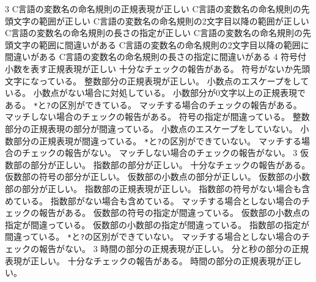 \ProblemNN{


\Newpage


}
{
{}{3}
	{
	{C言語の変数名の命名規則の正規表現が正しい}
	}
	{
	{C言語の変数名の命名規則の先頭文字の範囲が正しい}
	{C言語の変数名の命名規則の2文字目以降の範囲が正しい}
	{C言語の変数名の命名規則の長さの指定が正しい}
	}
	{
	{C言語の変数名の命名規則の先頭文字の範囲に間違いがある}
	{C言語の変数名の命名規則の2文字目以降の範囲に間違いがある}
	{C言語の変数名の命名規則の長さの指定に間違いがある}
	}
	{}{4}
	{
	{符号付小数を表す正規表現が正しい}
	{十分なチェックの報告がある。}
	}
	{
	{符号がないか先頭文字になっている。}
	{整数部分の正規表現が正しい。}
	{小数点のエスケープをしている。}
	{小数点がない場合に対処している。}
	{小数部分が0文字以上の正規表現である。}
	{\texttt{*}と\texttt{?}の区別ができている。}
	{マッチする場合のチェックの報告がある。}
	{マッチしない場合のチェックの報告がある。}
	}
	{
	{符号の指定が間違っている。}
	{整数部分の正規表現の部分が間違っている。}
	{小数点のエスケープをしていない。}
	{小数部分の正規表現が間違っている。}
	{\texttt{*}と\texttt{?}の区別ができていない。}
	{マッチする場合のチェックの報告がない。}
	{マッチしない場合のチェックの報告がない。}
	}
	{}{3}
	{
	{仮数部の部分が正しい。}
	{指数部の部分が正しい。}
	{十分なチェックの報告がある。}
	}
	{
	{仮数部の符号の部分が正しい。}
	{仮数部の小数点の部分が正しい。}
	{仮数部の小数部の部分が正しい。}
	{指数部の正規表現が正しい。}
	{指数部の符号がない場合も含めている。}
	{指数部がない場合も含めている。}
	{マッチする場合としない場合のチェックの報告がある。}
	}
	{
	{仮数部の符号の指定が間違っている。}
	{仮数部の小数点の指定が間違っている。}
	{仮数部の小数部の指定が間違っている。}
	{指数部の指定が間違っている。}
	{\texttt{*}と\texttt{?}の区別ができていない。}
	{マッチする場合としない場合のチェックの報告がない。}
	}
	{}{3}
	{
	{時間の部分の正規表現が正しい。}
	{分と秒の部分の正規表現が正しい。}
	{十分なチェックの報告がある。}
	}
	{
	{時間の部分の正規表現が正しい。}
}}
